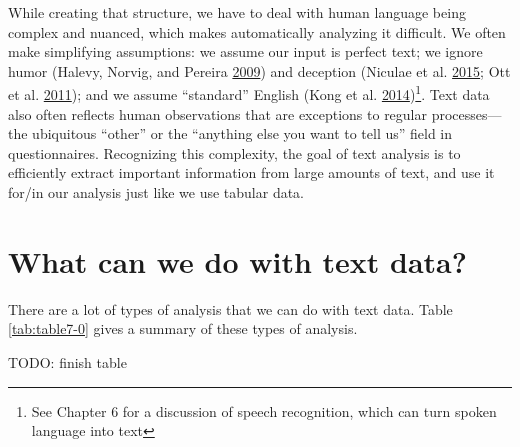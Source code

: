 \documentclass[]{krantz}
\begin{document}
While creating that structure, we have to deal with human language being
complex and nuanced, which makes automatically analyzing it difficult.
We often make simplifying assumptions: we assume our input is perfect
text; we ignore humor (Halevy, Norvig, and Pereira
\protect\hyperlink{ref-halevy-09}{2009}) and deception (Niculae et al.
\protect\hyperlink{ref-niculae-15}{2015}; Ott et al.
\protect\hyperlink{ref-ott-11}{2011}); and we assume ``standard''
English (Kong et al. \protect\hyperlink{ref-kong-14}{2014})\footnote{See
  Chapter 6 for a discussion of speech recognition, which can turn
  spoken language into text}. Text data also often reflects human
observations that are exceptions to regular processes---the ubiquitous
``other'' or the ``anything else you want to tell us'' field in
questionnaires. Recognizing this complexity, the goal of text analysis
is to efficiently extract important information from large amounts of
text, and use it for/in our analysis just like we use tabular data.

\section{What can we do with text
data?}\label{what-can-we-do-with-text-data}

There are a lot of types of analysis that we can do with text data.
Table \ref{tab:table7-0} gives a summary of these types of analysis.

TODO: finish table
\end{document}
